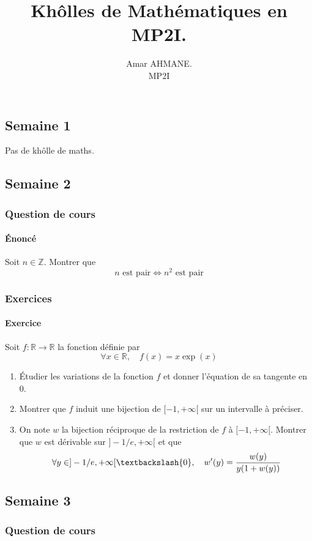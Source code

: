 \documentclass[10pt]{article}
\title{\Huge\textbf{Khôlles de Mathématiques en MP2I.}}
\author{Amar AHMANE.\\ MP2I}
\date{}
\def\Z{\mathbb Z}
\def\R{\mathbb R}
\def\Ssi{\Longleftrightarrow}
\begin{document}
    \maketitle

    \subsection*{Semaine 1}
    Pas de khôlle de maths.
    \subsection*{Semaine 2}
    \subsubsection*{Question de cours}
    \paragraph{Énoncé} Soit $n\in\Z$. Montrer que \[n\text{ est pair}\Ssi n^2\text{ est pair}\]

    \subsubsection*{Exercices}
    \paragraph{Exercice} Soit $f:\R\to\R$ la fonction définie par \[\forall x\in\R,\quad f(x)=x\exp(x)\]
    \begin{enumerate}
        \item Étudier les variations de la fonction $f$ et donner l'équation de sa tangente en $0$.
        \item Montrer que $f$ induit une bijection de $[-1,+\infty[$ sur un intervalle à préciser.
        \item On note $w$ la bijection réciproque de la restriction de $f$ à $[-1,+\infty[$. Montrer que $w$ est dérivable sur $]-1/e,+\infty[$ et que \[\forall y\in]-1/e,+\infty[\textbackslash\lbrace 0\rbrace,\quad w^\prime(y)=\frac{w(y)}{y(1+w(y))}\]
    \end{enumerate}

    \subsection*{Semaine 3}
    \subsubsection*{Question de cours}
\end{document}
